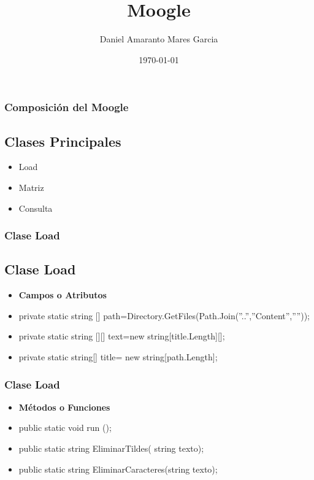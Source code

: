 \documentclass[17pt]{beamer}
\title{Moogle}
\author{Daniel Amaranto Mares Garcia}
\date{\today}
\begin{document}
\begin{frame}
\titlepage
\end{frame}

\begin{frame}
\frametitle{Composición del Moogle}
\subsection*{Clases Principales}
\begin{itemize}
    
    \item Load 
    \item Matriz
    \item Consulta      
    \end{itemize}
    \end{frame}

\begin{frame}
\frametitle{Clase Load}
\subsection*{Clase Load}
\begin{itemize}
    \item[] \textbf{Campos o Atributos}
    \item private static string [] path=Directory.GetFiles(Path.Join(”..”,”Content”,””));
    \item private static string [][] text=new string[title.Length][];
    \item private static string[] title= new string[path.Length];
\end{itemize}
\end{frame}
\begin{frame}
\frametitle{Clase Load}
\begin{itemize}
    \item[] \textbf{Métodos o Funciones}
    \item public static void run ();
    \item public static string EliminarTildes( string texto);
    \item public static string EliminarCaracteres(string texto);
 \end{itemize}
\end{frame}
    
\end{document}
